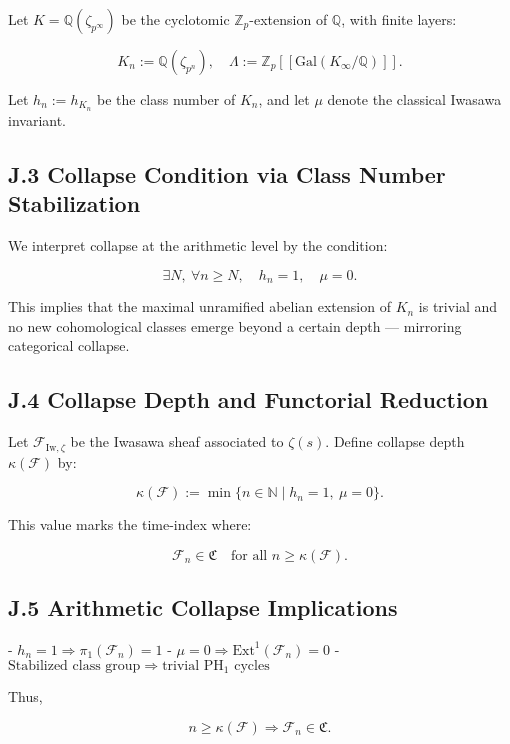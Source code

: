 \documentclass[11pt]{article}
\begin{document}
Let \( K = \mathbb{Q}(\zeta_{p^\infty}) \) be the cyclotomic $\mathbb{Z}_p$-extension of \( \mathbb{Q} \), with finite layers:

\[
K_n := \mathbb{Q}(\zeta_{p^n}),\quad \Lambda := \mathbb{Z}_p[[\mathrm{Gal}(K_\infty/\mathbb{Q})]].
\]

Let \( h_n := h_{K_n} \) be the class number of \( K_n \), and let \( \mu \) denote the classical Iwasawa invariant.

\subsection*{J.3 Collapse Condition via Class Number Stabilization}

We interpret collapse at the arithmetic level by the condition:

\[
\exists N,\ \forall n \geq N,\quad h_n = 1,\quad \mu = 0.
\]

This implies that the maximal unramified abelian extension of \( K_n \) is trivial and no new cohomological classes emerge beyond a certain depth — mirroring categorical collapse.

\subsection*{J.4 Collapse Depth and Functorial Reduction}

Let \( \mathcal{F}_{\mathrm{Iw}, \zeta} \) be the Iwasawa sheaf associated to \( \zeta(s) \). Define collapse depth \( \kappa(\mathcal{F}) \) by:

\[
\kappa(\mathcal{F}) := \min \{ n \in \mathbb{N} \mid h_n = 1,\ \mu = 0 \}.
\]

This value marks the time-index where:

\[
\mathcal{F}_{n} \in \mathfrak{C} \quad \text{for all } n \geq \kappa(\mathcal{F}).
\]

\subsection*{J.5 Arithmetic Collapse Implications}

- \( h_n = 1 \Rightarrow \pi_1(\mathcal{F}_n) = 1 \)
- \( \mu = 0 \Rightarrow \mathrm{Ext}^1(\mathcal{F}_n) = 0 \)
- \( \text{Stabilized class group} \Rightarrow \text{trivial } \mathrm{PH}_1 \text{ cycles} \)


Thus,

\[
n \geq \kappa(\mathcal{F}) \Rightarrow \mathcal{F}_n \in \mathfrak{C}.
\]
\end{document}
